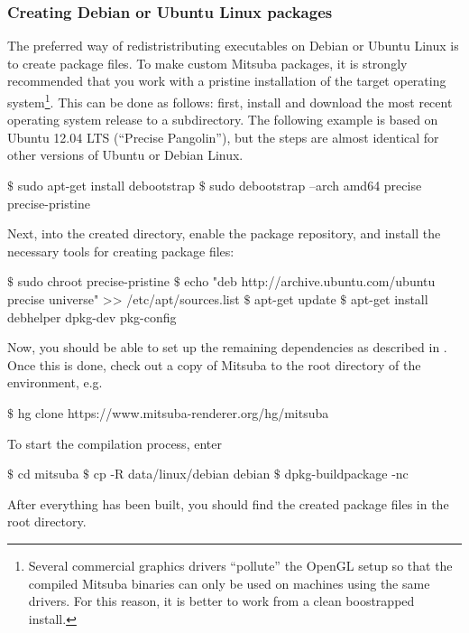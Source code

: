\subsubsection{Creating Debian or Ubuntu Linux packages}
The preferred way of redistristributing executables on Debian or Ubuntu Linux is to create
 package files. To make custom Mitsuba packages, it is strongly recommended
that you work with a pristine installation of the target operating system\footnote{Several commercial graphics 
drivers ``pollute'' the OpenGL setup so that the compiled Mitsuba binaries 
can only be used on machines using the same drivers. For this reason, it is 
better to work from a clean boostrapped install.}. This can be done as follows:
first, install  and download the most recent operating system release
to a subdirectory. The following example is based on Ubuntu 12.04 LTS (``Precise Pangolin''),
but the steps are almost identical for other versions of Ubuntu or Debian Linux.
\begin{shell}
$\text{\$}$ sudo apt-get install debootstrap
$\text{\$}$ sudo debootstrap --arch amd64 precise precise-pristine
\end{shell}
Next,  into the created directory, enable the  package repository,
and install the necessary tools for creating package files:
\begin{shell}
$\text{\$}$ sudo chroot precise-pristine
$\text{\$}$ echo "deb http://archive.ubuntu.com/ubuntu precise universe" >> /etc/apt/sources.list
$\text{\$}$ apt-get update
$\text{\$}$ apt-get install debhelper dpkg-dev pkg-config
\end{shell}
Now, you should be able to set up the remaining dependencies as described in .
Once this is done, check out a copy of Mitsuba to the root directory of the  environment, e.g.
\begin{shell}
$\text{\$}$ hg clone https://www.mitsuba-renderer.org/hg/mitsuba
\end{shell}
To start the compilation process, enter
\begin{shell}
$\text{\$}$ cd mitsuba
$\text{\$}$ cp -R data/linux/debian debian
$\text{\$}$ dpkg-buildpackage -nc
\end{shell}
After everything has been built, you should find the created package files
in the root directory.
